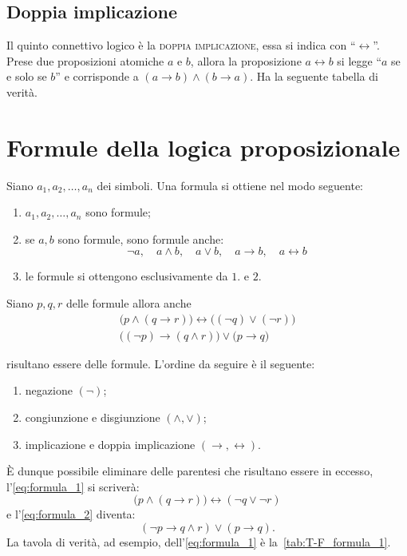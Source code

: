 \subsection{Doppia implicazione}\label{subsec:doppia_implicazione}
Il quinto connettivo logico è la \textsc{doppia implicazione}, essa si indica con ``\(\longleftrightarrow \)''. Prese due proposizioni atomiche \(a\) e \(b\), allora la proposizione \(a \longleftrightarrow  b\) si legge ``\(a\) se e solo se \(b\)'' e corrisponde a \((a \longrightarrow b) \land (b \longrightarrow a)\). Ha la seguente tabella di verità.




\section{Formule della logica proposizionale}\label{sec:formule_logica_proposizionale}
Siano \(a_1, a_2, \dotsc, a_n\) dei simboli. Una formula si ottiene nel modo seguente:
\begin{enumerate}
    \item \(a_1, a_2, \dotsc, a_n\) sono formule;
    \item se \(a,b\) sono formule, sono formule anche:
        \[
            \neg a, \quad a \land b, \quad a \lor b, \quad a \longrightarrow b, \quad a \longleftrightarrow  b
        \]
    \item le formule si ottengono esclusivamente da \(1\). e \(2\).
\end{enumerate}

\begin{example}
    Siano \(p, q, r\) delle formule allora anche
    \begin{gather}
        \big(p \land (q \longrightarrow r)\big) \longleftrightarrow \big((\neg q) \lor (\neg r)\big) \label{eq:formula_1} \\
        \big((\neg p) \longrightarrow (q \land r)\big) \lor \big(p \longrightarrow q\big) \label{eq:formula_2}    
    \end{gather}
\end{example}
risultano essere delle formule. L'ordine da seguire è il seguente:
\begin{enumerate}
    \item negazione \((\neg)\);
    \item congiunzione e disgiunzione \((\land, \lor)\);
    \item implicazione e doppia implicazione \((\longrightarrow, \longleftrightarrow)\).  
\end{enumerate}
È dunque possibile eliminare delle parentesi che risultano essere in eccesso, l'\ref{eq:formula_1} si scriverà:
\[
    \big(p \land (q \longrightarrow r)\big) \longleftrightarrow (\neg q \lor \neg r)
\]
e l'\ref{eq:formula_2} diventa:
\[
    (\neg p \longrightarrow q \land r) \lor (p \longrightarrow q).
\]
La tavola di verità, ad esempio, dell'\ref{eq:formula_1} è la~\cref{tab:T-F_formula_1}.\\

